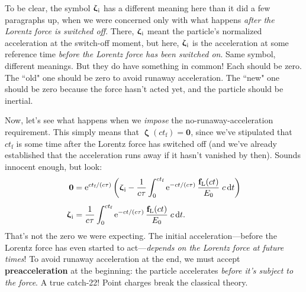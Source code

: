 \documentclass[12pt]{article}
\renewcommand{\vv}[1]{\mathbf{#1}}
\newcommand{\dd}[1]{\mathrm{d}#1}
\newcommand{\vvzeta}{\bm{\upzeta}}
\begin{document}
To be clear, the symbol $\vvzeta_{\mkern1mu \textrm{i}}$ has a different meaning here than it did a few paragraphs up, when we were concerned only with what happens \emph{after the Lorentz force is switched off}. There, $\vvzeta_{\mkern1mu \textrm{i}}$ meant the particle's normalized acceleration at the switch-off moment, but here, $\vvzeta_{\mkern1mu \textrm{i}}$ is the acceleration at some reference time \emph{before the Lorentz force has been switched on}. Same symbol, different meanings. But they do have something in common! Each should be zero. The ``old" one should be zero to avoid runaway acceleration. The ``new" one should be zero because the force hasn't acted yet, and the particle should be inertial.

Now, let's see what happens when we \emph{impose} the no-runaway-acceleration requirement. This simply means that ${\vvzeta (ct_{\textrm{f}}) = \vv 0}$, since we've stipulated that $ct_{\textrm{f}}$ is some time after the Lorentz force has switched off (and we've already established that the acceleration runs away if it hasn't vanished by then). Sounds innocent enough, but look:
\begin{equation*}
\begin{aligned}
\vv 0 &= \textrm{e}^{ct_{\textrm{f}} / (c \tau)} \left( \vvzeta_{\mkern1mu \textrm{i}} - \dfrac{1}{c \mkern.5mu \tau} \int_{0}^{ct_{\textrm{f}}} \textrm{e}^{-ct / (c \tau)} \, \dfrac{ \vv f_{\textrm{L}} (ct)}{E_0}  \; c \, \dd t \right) \\[4pt]
\vvzeta_{\mkern1mu \textrm{i}} &= \dfrac{1}{c \mkern.5mu \tau} \int_{0}^{ct_{\textrm{f}}} \textrm{e}^{-ct / (c \tau)} \, \dfrac{ \vv f_{\textrm{L}} (ct)}{E_0}  \; c \, \dd t .
\end{aligned}
\end{equation*}
That's not the zero we were expecting. The initial acceleration---before the Lorentz force has even started to act---\emph{depends on the Lorentz force at future times}! To avoid runaway acceleration at the end, we must accept \textbf{preacceleration} at the beginning: the particle accelerates \emph{before it's subject to the force}. A true catch-22! Point charges break the classical theory.
 

\end{document}

